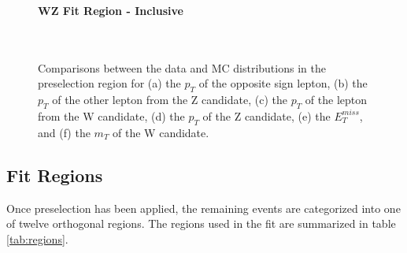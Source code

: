 
\begin{figure}[H]
    \centering
    \textbf{WZ Fit Region - Inclusive}\\
    \\      
    \\
    \caption{Comparisons between the data and MC distributions in the preselection region for (a) the $p_T$ of the opposite sign lepton, (b) the $p_T$ of the other lepton from the Z candidate, (c) the $p_T$ of the lepton from the W candidate, (d) the $p_T$ of the Z candidate, (e) the $E_T^{miss}$, and (f) the $m_T$ of the W candidate.}
    \label{kin:inclusive}
\end{figure}

\subsection{Fit Regions}
\label{subsec:regions}

Once preselection has been applied, the remaining events are categorized into one of twelve orthogonal regions. The regions used in the fit are summarized in table \ref{tab:regions}.

